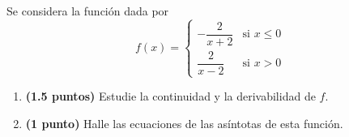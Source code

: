 
Se considera la función dada por
\[
f(x)=\begin{cases}-\dfrac{2}{x+2}&\text{si }x\leq0\\[0.8em]\dfrac{2}{x-2}&\text{si }x>0\end{cases}
\]
\begin{enumerate}[label=\alph*)]
\item \textbf{(1.5 puntos)} Estudie la continuidad y la derivabilidad de $f$.
\item \textbf{(1 punto)} Halle las ecuaciones de las asíntotas de esta función.
\end{enumerate}
